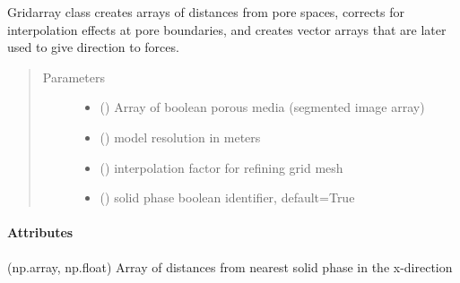\documentclass[letterpaper,10pt,english]{sphinxmanual}
\begin{document}
\begin{fulllineitems}
\label{\detokenize{index:lb_colloids.Colloids.Colloid_Setup.GridArray}}
Gridarray class creates arrays of distances from pore spaces, corrects for
interpolation effects at pore boundaries, and creates vector arrays that are
later used to give direction to forces.
\begin{quote}\begin{description}
\item[{Parameters}] \leavevmode\begin{itemize}
\item {} 
\sphinxstyleliteralstrong{) } (\sphinxstyleliteralemphasis{(}\sphinxstyleliteralemphasis{,}) \textendash{} Array of boolean porous media (segmented image array)

\item {} 
 () \textendash{} model resolution in meters

\item {} 
 () \textendash{} interpolation factor for refining grid mesh

\item {} 
 () \textendash{} solid phase boolean identifier, default=True

\end{itemize}

\end{description}\end{quote}
\paragraph{Attributes}

\begin{fulllineitems}
\label{\detokenize{index:lb_colloids.Colloids.Colloid_Setup.GridArray.gridx}}
 \textendash{} (np.array, np.float) Array of distances from nearest solid phase in the x-direction


\end{fulllineitems}
\end{fulllineitems}
\end{document}
